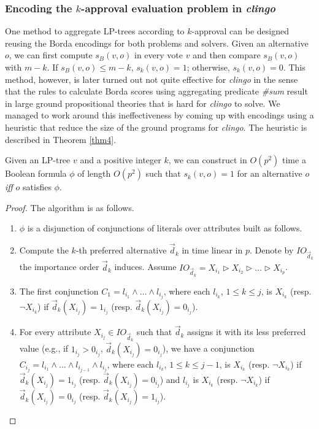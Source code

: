 \subsubsection{Encoding the $k$-approval evaluation problem in \emph{clingo}}
One method to aggregate LP-trees according to $k$-approval can be designed
reusing the Borda encodings for both problems and solvers.  Given an alternative $o$,
we can first compute $s_B(v,o)$ in every vote $v$ and then compare $s_B(v,o)$
with $m-k$.  If $s_B(v,o) \leq m-k$, $s_k(v,o)=1$; otherwise, $s_k(v,o)=0$.
This method, however, is later turned out not quite effective for 
\emph{clingo} in the sense
that the rules to calculate Borda scores using aggregating predicate 
\textit{\#sum} result in large ground propositional theories that
is hard for \emph{clingo} to solve.  We managed to work around this
ineffectiveness by coming up with encodings using a heuristic that
reduce the size of the ground programs for \emph{clingo}.  The
heuristic is described in Theorem \ref{thm4}.

\begin{thm}
\label{thm4}
	Given an LP-tree $v$ and a positive integer $k$, we can construct
	in $O(p^2)$ time a Boolean formula $\phi$ of length $O(p^2)$ such
	that $s_k(v,o)=1$ for an alternative $o$ \textit{iff} 
	$o$ satisfies $\phi$.
\end{thm}
\begin{proof}
	The algorithm is as follows.
	\begin{enumerate}
	  \item $\phi$ is a disjunction of conjunctions of literals over attributes built as follows.
	  \item Compute the $k$-th preferred alternative $\vec{d}_k$ in time linear in $p$.  
	        Denote by $IO_{\vec{d}_k}$ the importance order $\vec{d}_k$ induces.  Assume 
	        $IO_{\vec{d}_k} = X_{i_1} \rhd X_{i_2} \rhd \ldots \rhd X_{i_p} $.
	  \item The first conjunction $C_1 = l_{i_1} \wedge \ldots \wedge l_{i_j}$, where 
	        each $l_{i_k}$, $1 \leq k \leq j$, is $X_{i_k}$ (resp. $\neg X_{i_k}$) 
	        if $\vec{d}_k(X_{i_j})=1_{i_j}$ (resp. $\vec{d}_k(X_{i_j})=0_{i_j}$).
	  \item For every attribute $X_{i_j} \in IO_{\vec{d}_k}$ such that $\vec{d}_k$ assigns it 
	        with its less preferred value (e.g., if $1_{i_j} > 0_{i_j}$, $\vec{d}_k(X_{i_j})=0_{i_j}$), 
	        we have a conjunction $C_{i_j} = l_{i_1} \wedge \ldots \wedge l_{i_{j-1}} 
	        \wedge l_{i_j}$, where each $l_{i_k}$, $1 \leq k \leq j-1$, is $X_{i_k}$ (resp. $\neg X_{i_k}$) 
	        if $\vec{d}_k(X_{i_j})=1_{i_j}$ (resp. $\vec{d}_k(X_{i_j})=0_{i_j}$) and $l_{i_j}$ 
	        is $X_{i_k}$ (resp. $\neg X_{i_k}$) if $\vec{d}_k(X_{i_j})=0_{i_j}$ 
	        (resp. $\vec{d}_k(X_{i_j})=1_{i_j}$).
	\end{enumerate}
\end{proof}

